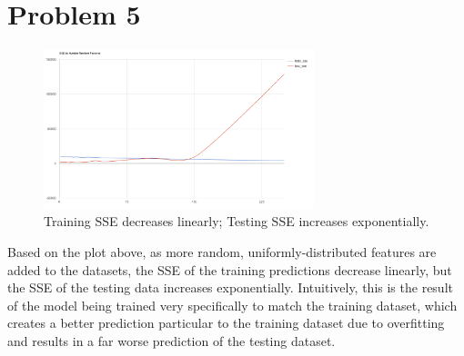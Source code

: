 \documentclass[journal]{IEEEtran}
\begin{document}
\section{Problem 5}
\begin{figure}[!htb]
\centering
\captionsetup{justification=centering,margin=2cm}
\includegraphics[width=0.7\textwidth]{sse_rand_features.PNG}
\caption{\label{rand}Training SSE decreases linearly; Testing SSE increases exponentially.}
\end{figure}
\smallskip
\noindent Based on the plot above, as more random, uniformly-distributed features
are added to the datasets, the SSE of the training predictions decrease linearly,
but the SSE of the testing data increases exponentially. Intuitively, this is the
result of the model being trained very specifically to match the training dataset,
which creates a better prediction particular to the training dataset due to overfitting
and results in a far worse prediction of the testing dataset. \newline
\bigskip
\end{document}
